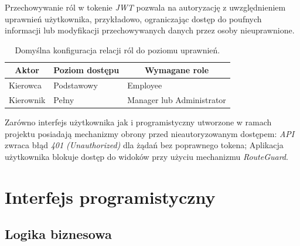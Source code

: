 \documentclass[eng,printmode,openany]{mgr}
\begin{document}
	Przechowywanie ról w tokenie \textit{JWT} pozwala na autoryzację z uwzględnieniem uprawnień użytkownika, przykładowo, ograniczając dostęp do poufnych informacji lub modyfikacji przechowywanych danych przez osoby nieuprawnione.
	
	
	\begin{table}[H]
		\caption{Domyślna konfiguracja relacji ról do poziomu uprawnień.}
		\begin{tabularx}{\textwidth}{|l|l|X|}
			\hline
			\multicolumn{1}{|c|}{\textbf{Aktor}} & \multicolumn{1}{c|}{\textbf{Poziom dostępu}} & \multicolumn{1}{c|}{\textbf{Wymagane role}} \\ \hline
			Kierowca                             & Podstawowy                                   & Employee                                    \\ \hline
			Kierownik                            & Pełny                                        & Manager lub Administrator                   \\ \hline
		\end{tabularx}
	\end{table}
	
	Zarówno interfejs użytkownika jak i programistyczny utworzone w ramach projektu posiadają mechanizmy obrony przed nieautoryzowanym dostępem: \textit{API} zwraca błąd \textit{401 (Unauthorized)} dla żądań bez poprawnego tokena; Aplikacja użytkownika blokuje dostęp do widoków przy użyciu mechanizmu \textit{RouteGuard}.
	
	\newpage
	\section{Interfejs programistyczny}
	\subsection{Logika biznesowa}
	
\end{document}
